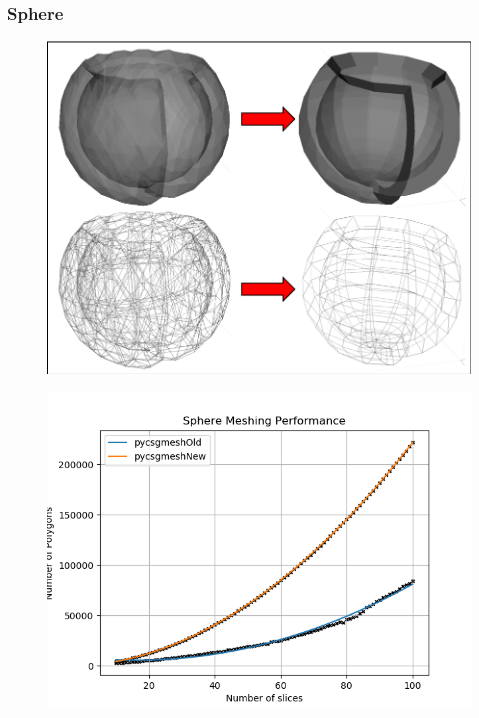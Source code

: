 \documentclass[12pt,a4paper]{article}
\begin{document}
\newpage
\subsubsection{Sphere}
\begin{figure}[h!]
\centering
\begin{minipage}{.2\textwidth}
  \centering
  \includegraphics[height=0.75\linewidth]{Images//Meshes//sphere.png}
  \label{fig:test1}
\end{minipage}%
\begin{minipage}{.3\textwidth}
  \centering
  \includegraphics[scale=0.35]{Images//Quad_fits//Sphere_quad.png}
  \label{fig:test2}
\end{minipage}%
\end{figure}
\end{document}
